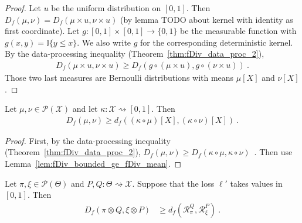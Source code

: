 \begin{proof}%
{}
Let $u$ be the uniform distribution on $[0,1]$. Then $D_f(\mu, \nu) = D_f(\mu \times u, \nu \times u)$ (by lemma TODO about kernel with identity as first coordinate).
Let $g : [0,1] \times [0,1] \to \{0,1\}$ be the measurable function with $g(x, y) = \mathbb{I}\{y \le x\}$. We also write $g$ for the corresponding deterministic kernel. By the data-processing inequality (Theorem~\ref{thm:fDiv_data_proc_2}),
\begin{align*}
D_f(\mu \times u, \nu \times u)
\ge D_f(g \circ (\mu \times u), g \circ (\nu \times u))
\: .
\end{align*}
Those two last measures are Bernoulli distributions with means $\mu[X]$ and $\nu[X]$.
\end{proof}


\begin{corollary}
  \label{cor:fDiv_ge_fDiv_mean_comp}
  Let $\mu, \nu \in \mathcal P(\mathcal X)$ and let $\kappa : \mathcal X \rightsquigarrow [0,1]$. Then
  \begin{align*}
  D_f(\mu, \nu) \ge d_f((\kappa \circ \mu)[X], (\kappa \circ \nu)[X]) \: .
  \end{align*}
\end{corollary}

\begin{proof}%
{}
First, by the data-processing inequality (Theorem~\ref{thm:fDiv_data_proc_2}),
$D_f(\mu, \nu) \ge D_f(\kappa \circ \mu, \kappa \circ \nu)$~.
Then use Lemma~\ref{lem:fDiv_bounded_ge_fDiv_mean}.
\end{proof}


\begin{lemma}
  \label{lem:fDiv_estimation_ge}
  Let $\pi, \xi \in \mathcal P(\Theta)$ and $P, Q : \Theta \rightsquigarrow \mathcal X$. Suppose that the loss $\ell'$ takes values in $[0,1]$. Then
  \begin{align*}
  D_f(\pi \otimes Q, \xi \otimes P)
  &\ge d_f(\mathcal R_\pi^Q, \mathcal R_\xi^P)
  \: .
  \end{align*}
\end{lemma}

